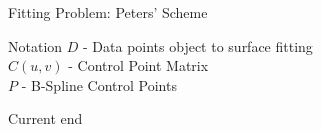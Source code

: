 \begin{frame}{Fitting Problem: Peters’ Scheme}

\begin{block}{Notation}
$D$ - Data  points object to surface fitting\\
$C(u,v)$ - Control Point Matrix \\
$P$ - B-Spline Control Points  \\
\end{block}

\end{frame}

\begin{frame}
Current end
\end{frame}

